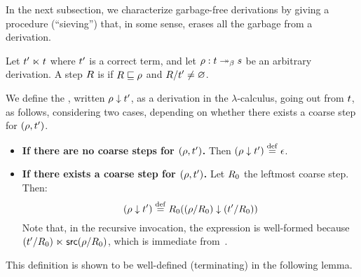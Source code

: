 
In the next subsection, we characterize garbage-free derivations by giving
a procedure (``sieving'') that, in some sense, erases all the garbage from a derivation.

\begin{definition}[Sieving]
Let $t' \mathrel{\ltimes} t$ where $t'$ is a correct term,
and let $\rho : t \mathrel{\twoheadrightarrow_\beta} s$ be an arbitrary derivation.
A step $R$ is  if
$R \sqsubseteq \rho$ and $R/t' \neq \varnothing$.

We define the ,
written $\rho \downarrow t'$, as a derivation in the $\lambda$-calculus,
going out from $t$, as follows, considering two cases, depending on whether there exists a
coarse step for $(\rho,t')$.
\begin{itemize}
\item {\bf If there are no coarse steps for $(\rho,t')$.}
  Then
  $(\rho \downarrow t') \overset{\mathrm{def}}{=} \epsilon$.
\item {\bf If there exists a coarse step for $(\rho,t')$.}
  Let $R_0$ the leftmost coarse step.
  Then:
  \[
    (\rho \downarrow t') \overset{\mathrm{def}}{=} R_0 ((\rho/R_0) \downarrow (t'/R_0))
  \]
  Note that, in the recursive invocation, the expression is well-formed because
  $(t'/R_0) \mathrel{\ltimes} \mathsf{src}(\rho/R_0)$,
  which is immediate from~.
\end{itemize}
This definition is shown to be well-defined (terminating) in the following lemma.
\end{definition}

